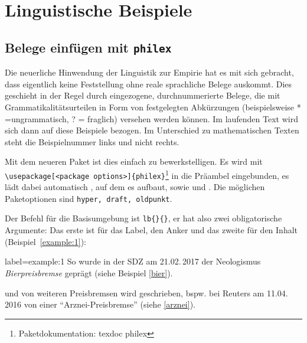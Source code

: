 
%

%

\section{Linguistische Beispiele}

\subsection{Belege einfügen mit \texttt{philex}}
\label{belege} 
\author{Christine Römer}

Die neuerliche Hinwendung der Linguistik zur Empirie hat es mit sich gebracht, dass eigentlich keine Feststellung ohne reale sprachliche Belege
auskommt. Dies geschieht in der Regel durch eingezogene, durchnummerierte Belege, die mit Grammatikalitätsurteilen in Form von festgelegten Abkürzungen (beispielsweise * =ungrammatisch, ? = fraglich) versehen werden können.
Im laufenden Text wird sich dann auf diese Beispiele bezogen. Im Unterschied zu mathematischen Texten steht die Beispielnummer links und nicht rechts.

Mit dem neueren Paket  ist dies einfach zu bewerkstelligen.
Es wird mit \verb|\usepackage[<package options>]{philex}|\footnote{Paketdokumentation: texdoc philex} in die Präambel eingebunden, es lädt dabei automatisch , auf dem es aufbaut, sowie  und . Die möglichen Paketoptionen sind \texttt{hyper, draft, oldpunkt}.

Der Befehl für die Basisumgebung ist  \verb|lb{}{}|, er hat also
zwei obligatorische Argumente: Das erste ist für das Label, den Anker und das zweite für den Inhalt (Beispiel~\ref{example:1}):

\begin{lfgwexample}{label={example:1}}
So wurde in der SDZ am 21.02.\,2017 der Neologismus \emph{Bierpreisbremse} geprägt (siehe Beispiel \ref{bier}).


und von weiteren Preisbremsen wird geschrieben, bspw. bei Reuters am 11.04.\,2016 von einer \enquote{Arznei-Preisbremse} (siehe \ref{arznei}).


\end{lfgwexample}

